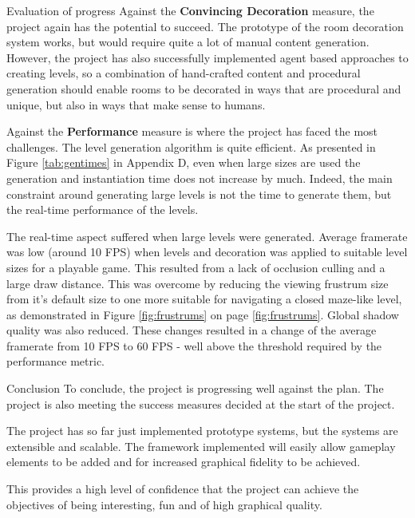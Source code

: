 \documentclass[progress]{cmpreport}
\begin{document}
\begin{section}{Evaluation of progress}
Against the \textbf{Convincing Decoration} measure, the project again has the potential to succeed. The prototype of the room decoration system works, but would require quite a lot of manual content generation. However, the project has also successfully implemented agent based approaches to creating levels, so a combination of hand-crafted content and procedural generation should enable rooms to be decorated in ways that are procedural and unique, but also in ways that make sense to humans.

Against the \textbf{Performance} measure is where the project has faced the most challenges. The level generation algorithm is quite efficient. As presented in Figure \ref{tab:gentimes} in Appendix D, even when large sizes are used the generation and instantiation time does not increase by much. Indeed, the main constraint around generating large levels is not the time to generate them, but the real-time performance of the levels.

The real-time aspect suffered when large levels were generated. Average framerate was low (around 10 FPS) when levels and decoration was applied to suitable level sizes for a playable game. This resulted from a lack of occlusion culling and a large draw distance. This was overcome by reducing the viewing frustrum size from it's default size to one more suitable for navigating a closed maze-like level, as demonstrated in Figure \ref{fig:frustrums} on page \ref{fig:frustrums}. Global shadow quality was also reduced. These changes resulted in a change of the average framerate from 10 FPS to 60 FPS - well above the threshold required by the performance metric.

\end{section}

\begin{section}{Conclusion}
To conclude, the project is progressing well against the plan. The project is also meeting the success measures decided at the start of the project.

The project has so far just implemented prototype systems, but the systems are extensible and scalable. The framework implemented will easily allow gameplay elements to be added and for increased graphical fidelity to be achieved. 

This provides a high level of confidence that the project can achieve the objectives of being interesting, fun and of high graphical quality.

\end{section}
\end{document}
